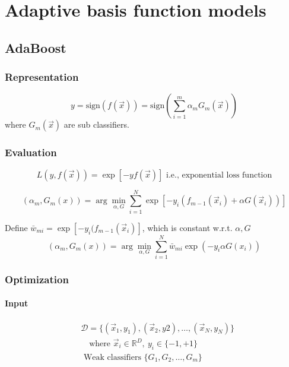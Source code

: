 \chapter{Adaptive basis function models}


\section{AdaBoost}


\subsection{Representation}
\begin{equation}
y=\text{sign}(f(\vec{x}))=\text{sign}\left(\sum\limits_{i=1}^m \alpha_mG_m(\vec{x})\right)
\end{equation}
where $G_m(\vec{x})$ are sub classifiers.


\subsection{Evaluation}
\begin{equation} \nonumber
L(y,f(\vec{x}))=\exp[-yf(\vec{x})] \text{  i.e., exponential loss function}
\end{equation}

\begin{equation}
(\alpha_m,G_m(x))= \arg\min_{\alpha,G} \sum_{i=1}^N \exp{[-y_i(f_{m-1}(\vec{x}_i)+\alpha G(\vec{x}_i))]}
\end{equation}

Define $\bar{w}_{mi}=\exp{[-y_i(f_{m-1}(\vec{x}_i)]}$, which is constant w.r.t. $\alpha, G$
\begin{equation}
(\alpha_m,G_m(x))= \arg\min_{\alpha,G} \sum_{i=1}^N {\bar{w}}_{mi} \exp{(-y_i \alpha G(x_i))}
\end{equation}


\subsection{Optimization}


\subsubsection{Input}
\begin{eqnarray*}
& \mathcal{D}=\{(\vec{x}_1,y_1),(\vec{x}_2,y2),\dots,(\vec{x}_N,y_N)\} \\
& \quad \text{where } \vec{x}_i \in \mathbb{R}^D,\ y_i \in \{-1,+1\} \\
& \text{ Weak classifiers } \{G_1,G_2,\dots,G_m\}
\end{eqnarray*}


